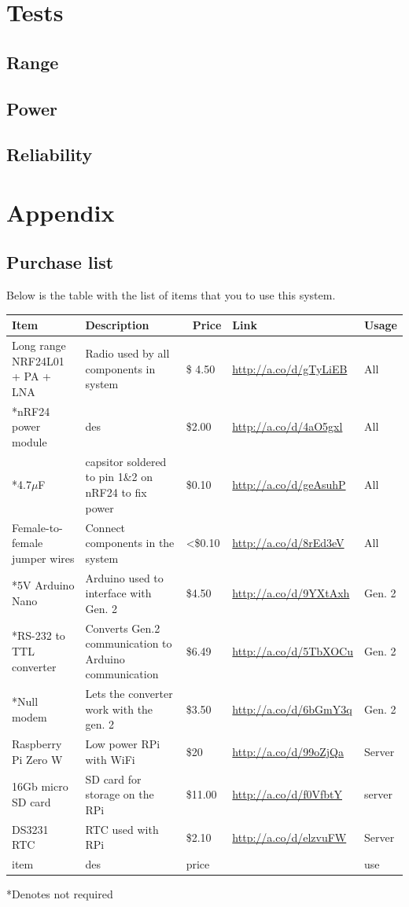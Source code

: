 \documentclass[12pt]{article}
\begin{document}
\section{Tests}
\subsection{Range}
\subsection{Power}
\subsection{Reliability}

\section{Appendix}
\subsection{Purchase list}
Below is the table with the list of items that you to use this system.
\begin{center}
\begin{tabularx}{\textwidth}{ |X|X|X|X|X| }
	\hline
	\textbf{Item} & \textbf{Description} & \textbf{~Price} & \textbf{Link} & \textbf{Usage}\\ 
	\hline
	Long range NRF24L01 + PA + LNA & Radio used by all components in system & \$ 4.50 & \url{http://a.co/d/gTyLiEB} & All \\ 
	\hline
	*nRF24 power module & des & \$2.00 & \url{http://a.co/d/4aO5gxl} & All \\ 
	\hline
	*4.7$\mu$F & capsitor soldered to pin 1\&2 on nRF24 to fix power & \$0.10 & \url{http://a.co/d/geAsuhP} & All \\ 
	\hline
	Female-to-female jumper wires & Connect components in the system & \textless\$0.10 & \url{http://a.co/d/8rEd3eV} & All \\ 
	\hline
	*5V Arduino Nano & Arduino used to interface with Gen. 2 & \$4.50 & \url{http://a.co/d/9YXtAxh} &  Gen. 2 \\ 
	\hline
	*RS-232 to TTL converter & Converts Gen.2 communication to Arduino communication & \$6.49 & \url{http://a.co/d/5TbXOCu} & Gen. 2 \\ 
	\hline
	*Null modem & Lets the converter work with the gen. 2 & \$3.50 & \url{http://a.co/d/6bGmY3q} & Gen. 2 \\ 
	\hline
	Raspberry Pi Zero W & Low power RPi with WiFi & \$20 & \url{http://a.co/d/99oZjQa} & Server \\ 
	\hline
	16Gb micro SD card & SD card for storage on the RPi & \$11.00 & \url{http://a.co/d/f0VfbtY} & server \\ 
	\hline
	DS3231 RTC & RTC used with RPi & \$2.10 & \url{http://a.co/d/elzvuFW} & Server \\ 
	\hline
	item & des & price & \url{} & use \\ 
	\hline
	
\end{tabularx}
*Denotes not required
\end{center}
\end{document}
